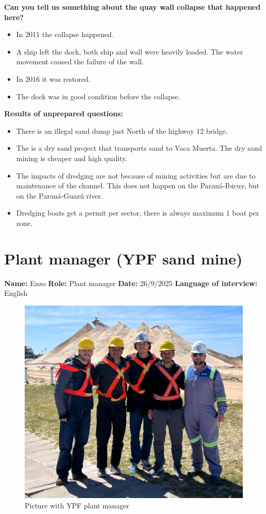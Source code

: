 \newpage
\textbf{Can you tell us something about the quay wall collapse that happened here?}
\begin{itemize}
    \item In 2011 the collapse happened.
    \item A ship left the dock, both ship and wall were heavily loaded. The water movement caused the failure of the wall.
    \item In 2016 it was restored.
    \item The dock was in good condition before the collapse.
\end{itemize}

\textbf{Results of unprepared questions:}
\begin{itemize}
    \item There is an illegal sand dump just North of the highway 12 bridge.
    \item The is a dry sand project that transports sand to Vaca Muerta. The dry sand mining is cheaper and high quality.
    \item The impacts of dredging are not because of mining activities but are due to maintenance of the channel. This does not happen on the Paraná-Ibicuy, but on the Paraná-Guazú river.
    \item Dredging boats get a permit per sector, there is always maximum 1 boat per zone.
\end{itemize}

\section{Plant manager (YPF sand mine)}
\textbf{Name:} Enzo \newline
\textbf{Role:} Plant manager \newline
\textbf{Date:} 26/9/2025 \newline
\textbf{Language of interview:} English

\begin{figure}[H]
    \centering
    \includegraphics[width=0.4\linewidth]{figures/appendixE/InterviewYPF.jpeg}
    \caption{Picture with YPF plant manager}
\end{figure}

